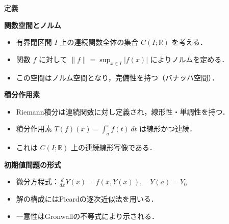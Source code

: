 \documentclass[aspectratio=169]{beamer}
\newenvironment{sectionblock}[1]{%
  \begin{minipage}{\textwidth}%
    \textbf{\large #1}\par\vspace{0.5em}%
}{%
  \end{minipage}\vspace{1em}%
}
\newcommand{\sectioncontent}[2]{%
  \begin{sectionblock}{#1}%
    \begin{itemize}%
      #2%
    \end{itemize}%
  \end{sectionblock}%
}
\begin{document}
\begin{frame}{定義}

\sectioncontent{関数空間とノルム}{
  \item 有界閉区間 $I$ 上の連続関数全体の集合 $C(I; \mathbb{R})$ を考える．
  \item 関数 $f$ に対して $\|f\| = \sup_{x \in I} |f(x)|$ によりノルムを定める．
  \item この空間はノルム空間となり，完備性を持つ（バナッハ空間）．
}

\sectioncontent{積分作用素}{
  \item Riemann積分は連続関数に対し定義され，線形性・単調性を持つ．
  \item 積分作用素 $T(f)(x) = \int_a^x f(t)\,dt$ は線形かつ連続．
  \item これは $C(I; \mathbb{R})$ 上の連続線形写像である．
}

\sectioncontent{初期値問題の形式}{
  \item 微分方程式：$\frac{d}{dx}Y(x) = f(x, Y(x)),\quad Y(a) = Y_0$
  \item 解の構成にはPicardの逐次近似法を用いる．
  \item 一意性はGronwallの不等式により示される．
}

\end{frame}
\end{document}
